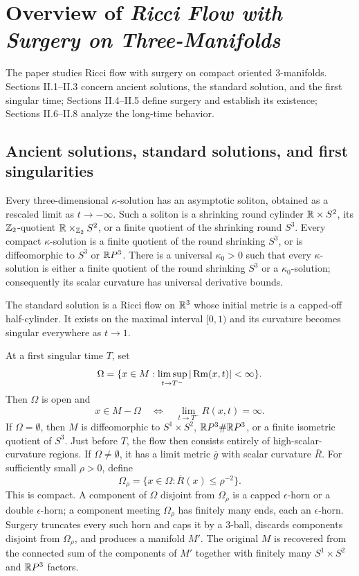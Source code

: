 \section{Overview of
\emph{Ricci Flow with Surgery on Three-Manifolds} \cite{Perelman2}} \label{overview2}

The paper studies Ricci flow with surgery on compact oriented $3$-manifolds.
Sections II.1--II.3 concern ancient solutions, the standard solution, and the
first singular time; Sections II.4--II.5 define surgery and establish its
existence; Sections II.6--II.8 analyze the long-time behavior.

\subsection{Ancient solutions, standard solutions, and first singularities}

Every three-dimensional $\kappa$-solution has an asymptotic soliton, obtained
as a rescaled limit as $t\to-\infty$. Such a soliton is a shrinking round
cylinder ${\mathbb R}\times S^2$, its ${\mathbb Z}_2$-quotient
${\mathbb R}\times_{{\mathbb Z}_2}S^2$, or a finite quotient of the shrinking round $S^3$.
Every compact $\kappa$-solution is a finite quotient of the round shrinking
$S^3$, or is diffeomorphic to $S^3$ or ${\mathbb R} P^3$. There is a universal
$\kappa_0>0$ such that every $\kappa$-solution is either a finite quotient of
the round shrinking $S^3$ or a $\kappa_0$-solution; consequently its scalar
curvature has universal derivative bounds.

The standard solution is a Ricci flow on ${\mathbb R}^3$ whose initial metric is a
capped-off half-cylinder. It exists on the maximal interval $[0,1)$ and its
curvature becomes singular everywhere as $t\to1$.

At a first singular time $T$, set
\[
\Omega=\{x\in M:\limsup_{t\to T^-}|\operatorname{Rm}(x,t)|<\infty\}.
\]
Then $\Omega$ is open and
\[
x\in M-\Omega\quad\Longleftrightarrow\quad
\lim_{t\to T^-}R(x,t)=\infty.
\]
If $\Omega=\emptyset$, then $M$ is diffeomorphic to
$S^1\times S^2$, ${\mathbb R} P^3\#{\mathbb R} P^3$, or a finite isometric quotient of
$S^3$. Just before $T$, the flow then consists entirely of
high-scalar-curvature regions. If $\Omega\ne\emptyset$, it has a limit metric $\overline g$ with
scalar curvature $\overline R$. For sufficiently small $\rho>0$, define
\[
\Omega_\rho=\{x\in\Omega:\overline R(x)\le\rho^{-2}\}.
\]
This is compact. A component of $\Omega$ disjoint from $\Omega_\rho$ is a
capped $\epsilon$-horn or a double $\epsilon$-horn; a component meeting
$\Omega_\rho$ has finitely many ends, each an $\epsilon$-horn. Surgery
truncates every such horn and caps it by a $3$-ball, discards components
disjoint from $\Omega_\rho$, and produces a manifold $M'$. The original $M$
is recovered from the connected sum of the components of $M'$ together with
finitely many $S^1\times S^2$ and ${\mathbb R} P^3$ factors.

